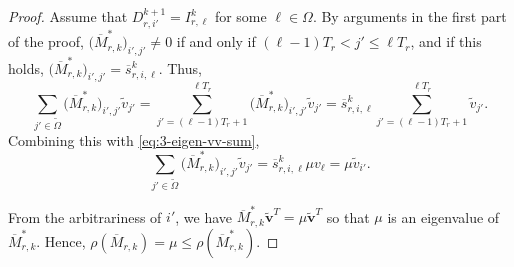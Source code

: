 \documentclass[11pt]{amsart}
\theoremstyle{definition}
\theoremstyle{remark}
\numberwithin{equation}{section}
\newcommand{\bfv}{{\mathbf v}}
\newcommand{\upM}{{\overline{M}}}
\newcommand{\ups}{{\overline{s} }}
\def\wdt{\widetilde}
\begin{document}
\begin{proof}
Assume that $D_{r,i'}^{k+1}=I_{r,\ell}^k$ for some $\ell\in \Omega$. By arguments in the first part of the proof, $\big(\upM_{r,k}^*\big)_{i',j'}\not=0$ if and only if $(\ell-1)T_r<j'\leq \ell T_r$, and if this holds, $\big(\upM_{r,k}^*\big)_{i',j'}=\ups_{r,i,\ell}^k$. Thus,
\[
\sum_{j'\in \wdt{\Omega}} \big(\upM_{r,k}^*\big)_{i',j'} \wdt{v}_{j'}=\sum_{j'=(\ell-1)T_r+1}^{\ell T_r} \big(\upM_{r,k}^*\big)_{i',j'} \wdt{v}_{j'}=\ups_{r,i,\ell}^k \sum_{j'=(\ell-1)T_r+1}^{ \ell T_r }  \wdt{v}_{j'}. 
\]
Combining this with \eqref{eq:3-eigen-vv-sum}, 
\[
\sum_{j'\in \wdt{\Omega}} \big(\upM_{r,k}^*\big)_{i',j'} \wdt{v}_{j'}=\ups_{r,i,\ell}^k \mu v_{\ell}=\mu \wdt{v}_{i'}.
\]

From the arbitrariness of $i'$, we have $\upM_{r,k}^*  \wdt{\bfv}^T =\mu \wdt{\bfv}^T$ so that $\mu$ is an eigenvalue of $\upM_{r,k}^*$. Hence, 
$\rho(\upM_{r,k})=\mu\leq \rho(\upM_{r,k}^*)$.
\end{proof}	
\end{document}
